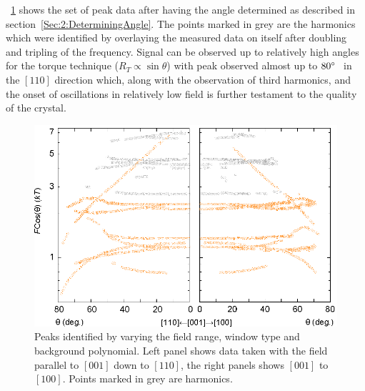 \Fig~\ref{Fig:3:AngleSweepMeasured} shows the set of peak data after having the angle determined as described in section~\ref{Sec:2:DeterminingAngle}. The points marked in grey are the harmonics which were identified by overlaying the measured data on itself after doubling and tripling of the frequency. Signal can be observed up to relatively high angles for the torque technique ($R_T \propto \sin{\theta}$) with peak observed almost up to $80\degree$  in the $[110]$ direction which, along with the observation of third harmonics, and the onset of oscillations in relatively low field is further testament to the quality of the crystal.
\begin{figure}[htbp]
    \begin{center}
        \includegraphics[scale=0.9]{Chapter3-dHvABaFe2P2/Figures/AngleDepMeasurements/AngleSweepMeasured/AngleSweepMeasured}
        \caption{Peaks identified by varying the field range, window type and background polynomial. Left panel shows data taken with the field parallel to $[001]$ down to $[110]$, the right panels shows $[001]$ to $[100]$. Points marked in grey are harmonics.}
        \label{Fig:3:AngleSweepMeasured}
    \end{center}
\end{figure}

